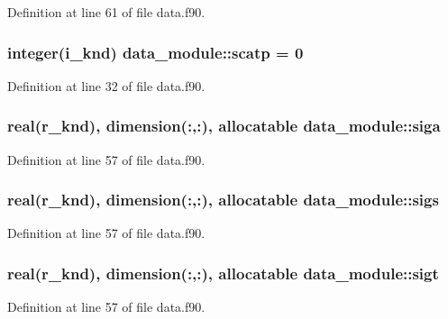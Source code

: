 Definition at line 61 of file data.\-f90.

\hypertarget{classdata__module_a7ac9af7f12e8f03d3ba40fa78904d5a1}{
\subsubsection[{scatp}]{\setlength{\rightskip}{0pt plus 5cm}integer(i\-\_\-knd) data\-\_\-module\-::scatp = 0}}\label{classdata__module_a7ac9af7f12e8f03d3ba40fa78904d5a1}


Definition at line 32 of file data.\-f90.

\hypertarget{classdata__module_a536d3b44d8d6b245eabd2672f5cc8d65}{
\subsubsection[{siga}]{\setlength{\rightskip}{0pt plus 5cm}real(r\-\_\-knd), dimension(\-:,\-:), allocatable data\-\_\-module\-::siga}}\label{classdata__module_a536d3b44d8d6b245eabd2672f5cc8d65}


Definition at line 57 of file data.\-f90.

\hypertarget{classdata__module_a198158103501dbae827a7ccee2a1f91f}{
\subsubsection[{sigs}]{\setlength{\rightskip}{0pt plus 5cm}real(r\-\_\-knd), dimension(\-:,\-:), allocatable data\-\_\-module\-::sigs}}\label{classdata__module_a198158103501dbae827a7ccee2a1f91f}


Definition at line 57 of file data.\-f90.

\hypertarget{classdata__module_a3455329887f17be6b34eaa771348a3bf}{
\subsubsection[{sigt}]{\setlength{\rightskip}{0pt plus 5cm}real(r\-\_\-knd), dimension(\-:,\-:), allocatable data\-\_\-module\-::sigt}}\label{classdata__module_a3455329887f17be6b34eaa771348a3bf}


Definition at line 57 of file data.\-f90.

